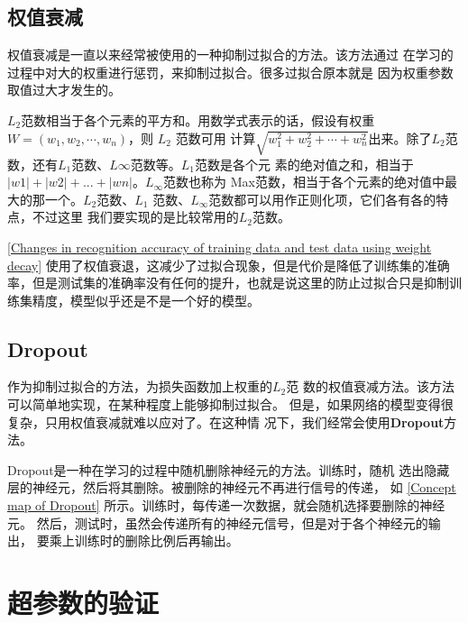 \subsection{权值衰减}
权值衰减是一直以来经常被使用的一种抑制过拟合的方法。该方法通过
在学习的过程中对大的权重进行惩罚，来抑制过拟合。很多过拟合原本就是
因为权重参数取值过大才发生的。
\begin{tcolorbox}
    $L_2$范数相当于各个元素的平方和。用数学式表示的话，假设有权重
    $W = (w_1, w_2, \cdots , w_n)$，则 $L_2$ 范数可用
    计算$\sqrt{w_1^2+w_2^2+\cdots+w_n^2}$出来。除了$L_2$范数，还有$L_1$范数、$L\infty$范数等。$L_1$范数是各个元
    素的绝对值之和，相当于$|w1| + |w2| + . . . + |wn|$。$L_{\infty}$范数也称为
    Max范数，相当于各个元素的绝对值中最大的那一个。$L_2$范数、$L_1$
    范数、$L_{\infty}$范数都可以用作正则化项，它们各有各的特点，不过这里
    我们要实现的是比较常用的$L_2$范数。
\end{tcolorbox}

\autoref{Changes in recognition accuracy of training data and test data using weight decay} 使用了权值衰退，这减少了过拟合现象，但是代价是降低了训练集的准确率，但是测试集的准确率没有任何的提升，也就是说这里的防止过拟合只是抑制训练集精度，模型似乎还是不是一个好的模型。
\subsection{Dropout}
作为抑制过拟合的方法，为损失函数加上权重的$L_2$范
数的权值衰减方法。该方法可以简单地实现，在某种程度上能够抑制过拟合。
但是，如果网络的模型变得很复杂，只用权值衰减就难以应对了。在这种情
况下，我们经常会使用\textbf{Dropout}方法。

Dropout是一种在学习的过程中随机删除神经元的方法。训练时，随机
选出隐藏层的神经元，然后将其删除。被删除的神经元不再进行信号的传递，
如 \autoref{Concept map of Dropout} 所示。训练时，每传递一次数据，就会随机选择要删除的神经元。
然后，测试时，虽然会传递所有的神经元信号，但是对于各个神经元的输出，
要乘上训练时的删除比例后再输出。

\section{超参数的验证}